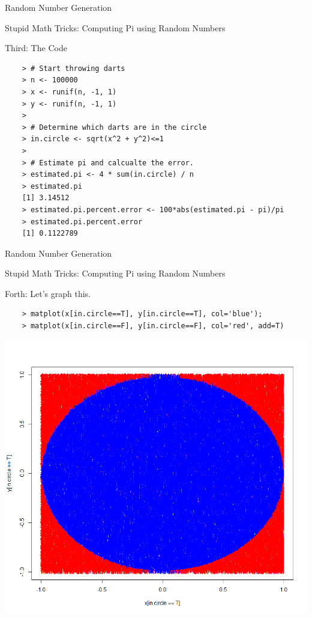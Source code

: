 \documentclass{beamer}
\begin{document}
\begin{frame}{Random Number Generation}

    Stupid Math Tricks: Computing Pi using Random Numbers

    Third: The Code

    \begin{verbatim}
    > # Start throwing darts
    > n <- 100000
    > x <- runif(n, -1, 1)
    > y <- runif(n, -1, 1)
    > 
    > # Determine which darts are in the circle
    > in.circle <- sqrt(x^2 + y^2)<=1
    > 
    > # Estimate pi and calcualte the error.
    > estimated.pi <- 4 * sum(in.circle) / n
    > estimated.pi
    [1] 3.14512
    > estimated.pi.percent.error <- 100*abs(estimated.pi - pi)/pi
    > estimated.pi.percent.error
    [1] 0.1122789
    \end{verbatim}

\end{frame}

\begin{frame}{Random Number Generation}

    Stupid Math Tricks: Computing Pi using Random Numbers

    Forth: Let's graph this.

    \begin{verbatim}
    > matplot(x[in.circle==T], y[in.circle==T], col='blue');
    > matplot(x[in.circle==F], y[in.circle==F], col='red', add=T)
    \end{verbatim}

    \includegraphics{dartboard.png}

\end{frame}
\end{document}

